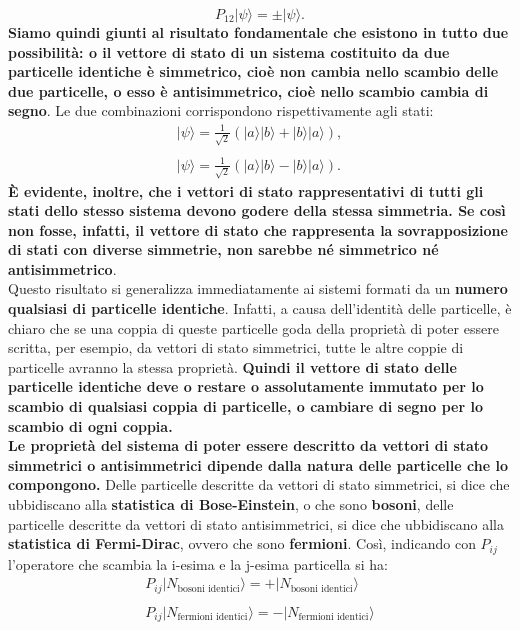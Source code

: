 \begin{equation}
P_{12} |\psi\rangle= \pm |\psi\rangle .
\end{equation}
\textbf{Siamo quindi giunti al risultato fondamentale che esistono in tutto due possibilità: o il vettore di stato di un sistema costituito da due particelle identiche è simmetrico, cioè non cambia nello scambio delle due particelle, o esso è antisimmetrico, cioè nello scambio cambia di segno}. Le due combinazioni corrispondono rispettivamente agli stati:
\begin{eqnarray}
\label{eq:cap20_4}
|\psi\rangle= \frac{1}{\sqrt{2}}\left(|a\rangle |b\rangle + |b\rangle|a\rangle \right) ,\nonumber \\
\\
|\psi\rangle= \frac{1}{\sqrt{2}}\left(|a\rangle |b\rangle - |b\rangle|a\rangle \right). \nonumber
\end{eqnarray}
\textbf{È evidente, inoltre, che i vettori di stato rappresentativi di tutti gli stati dello stesso sistema devono godere della stessa simmetria. Se così non fosse, infatti, il vettore di stato che rappresenta la sovrapposizione di stati con diverse simmetrie, non sarebbe né simmetrico né antisimmetrico}.\\
Questo risultato si generalizza immediatamente ai sistemi formati da un \textbf{numero qualsiasi di particelle identiche}. Infatti, a causa dell'identità delle particelle, è chiaro che se una coppia di queste particelle goda della proprietà di poter essere scritta, per esempio, da vettori di stato simmetrici, tutte le altre coppie di particelle avranno la stessa proprietà. \textbf{Quindi il vettore di stato delle particelle identiche deve o restare o assolutamente immutato per lo scambio di qualsiasi coppia di particelle, o cambiare di segno per lo scambio di ogni coppia.}\\
\textbf{Le proprietà del sistema di poter essere descritto da vettori di stato simmetrici o antisimmetrici dipende dalla natura delle particelle che lo compongono.} Delle particelle descritte da vettori di stato simmetrici, si dice che ubbidiscano alla \textbf{statistica di Bose-Einstein}, o che sono \textbf{bosoni}, delle particelle descritte da vettori di stato antisimmetrici, si dice che ubbidiscano alla \textbf{statistica di Fermi-Dirac}, ovvero che sono \textbf{fermioni}. Così, indicando con $P_{ij}$ l'operatore che scambia la i-esima e la j-esima particella si ha:
\begin{eqnarray}
&P_{ij} |N_{\textrm{bosoni identici}}\rangle= +|N_{\textrm{bosoni identici}}\rangle & \nonumber \\
\\
&P_{ij} |N_{\textrm{fermioni identici}}\rangle= -|N_{\textrm{fermioni identici}}\rangle & \nonumber
\end{eqnarray}
